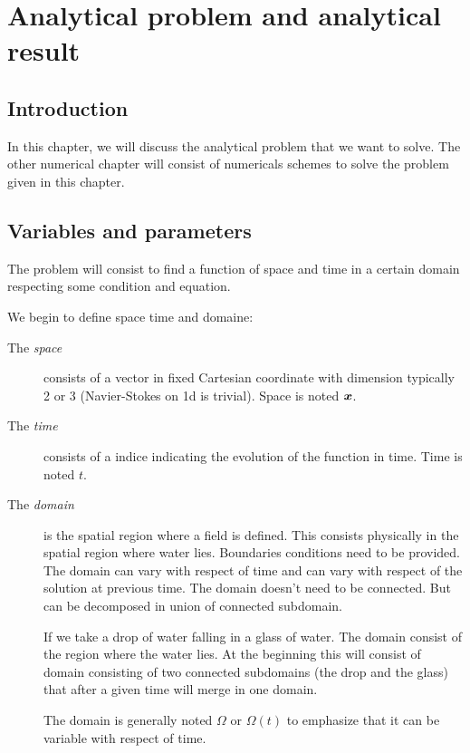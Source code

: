 \chapter{Analytical problem and analytical result}

\minitoc
\section*{Introduction}
In this chapter, we will discuss the analytical problem that we want to solve.
The other numerical chapter will consist of numericals schemes to solve the problem given in this chapter.

\section{Variables and parameters}

The problem will consist to find a function of space and time in a certain domain respecting some condition and equation.

We begin to define space time and domaine:
\begin{description}
\item[The \emph{space}] consists of a vector in fixed Cartesian coordinate with dimension typically 2 or 3 (Navier-Stokes on 1d is trivial).
Space is noted ${\boldsymbol {x}}$.
\item[The \emph{time}] consists of a indice indicating the evolution of the function in time.
Time is noted $t$.
\item[The \emph{domain}] is the spatial region where a field is defined. This consists physically in the spatial region where water lies.
Boundaries conditions need to be provided.
The domain can vary with respect of time and can vary with respect of the solution at previous time.
The domain doesn't need to be connected. But can be decomposed in union of connected subdomain.

\begin{example}
 If we take a drop of water falling in a glass of water. The domain consist of the region where the water lies.
 At the beginning this will consist of domain consisting of two connected subdomains (the drop and the glass)
 that after a given time will merge in one domain.
\end{example}

The domain is generally noted $\Omega$ or $\Omega(t)$ to emphasize that it can be variable with respect of time.
\end{description}

